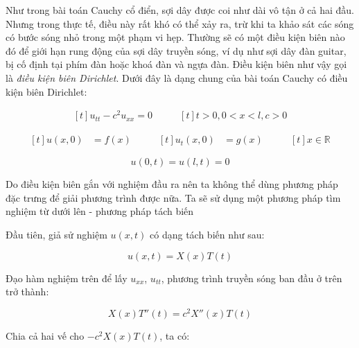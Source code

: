 \documentclass[a4paper]{article}
\begin{document}
Như trong bài toán Cauchy cổ điển, sợi dây được coi như dài vô tận ở cả hai đầu. Nhưng trong thực tế, điều này rất khó có thể xảy ra, trừ khi ta khảo sát các sóng có bước sóng nhỏ trong một phạm vi hẹp. Thường sẽ có một điều kiện biên nào đó để giới hạn rung động của sợi dây truyền sóng, ví dụ như sợi dây đàn guitar, bị cố định tại phím đàn hoặc khoá đàn và ngựa đàn. Điều kiện biên như vậy gọi là \emph{điều kiện biên Dirichlet}. Dưới đây là dạng chung của bài toán Cauchy có điều kiện biên Dirichlet:

\begin{equation*}
\begin{aligned}[t]
u_{tt} - c^2u_{xx} = 0
\end{aligned}
\qquad
\begin{aligned}[t]
t > 0, 0 < x < l, c > 0
\end{aligned}
\end{equation*}

\begin{equation*}
\begin{aligned}[t]
u(x, 0) &= f(x)
\end{aligned}
\qquad
\begin{aligned}[t]
u_t(x, 0) &= g(x)
\end{aligned}
\qquad
\begin{aligned}[t]
x \in \mathbb{R}
\end{aligned}
\end{equation*}

\begin{equation*}
u(0, t) = u(l, t) = 0
\end{equation*}

Do điều kiện biên gắn với nghiệm đầu ra nên ta không thể dùng phương pháp đặc trưng để giải phương trình được nữa. Ta sẽ sử dụng một phương pháp tìm nghiệm từ dưới lên - phương pháp tách biến

Đầu tiên, giả sử nghiệm $u(x, t)$ có dạng tách biến như sau:

\begin{equation*}
    u(x, t) = X(x)T(t)
\end{equation*}

Đạo hàm nghiệm trên để lấy $u_{xx}$, $u_{tt}$, phương trình truyền sóng ban đầu ở trên trở thành:

\begin{equation*}
    X(x)T''(t) = c^2X''(x)T(t)
\end{equation*}

Chia cả hai vế cho $-c^2X(x)T(t)$, ta có:
\end{document}
